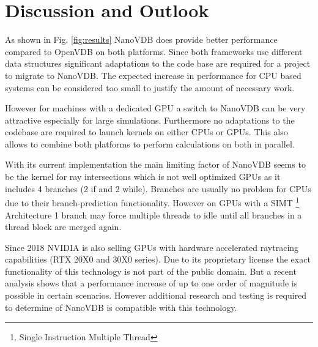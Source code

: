 \section{Discussion and Outlook}

As shown in Fig. \ref{fig:results} NanoVDB does provide better performance compared to OpenVDB on both platforms.
Since both frameworks use different data structures significant adaptations to the code base are required for a project to migrate to NanoVDB. 
The expected increase in performance for CPU based systems can be considered too small to justify the amount of necessary work.

However for machines with a dedicated GPU a switch to NanoVDB can be very attractive especially for large simulations.
Furthermore no adaptations to the codebase are required to launch kernels on either CPUs or GPUs.
This also allows to combine both platforms to perform calculations on both in parallel.

With its current implementation the main limiting factor of NanoVDB seems to be the kernel for ray intersections which is not well optimized GPUs as it includes 4 branches (2 if and 2 while).
Branches are usually no problem for CPUs due to their branch-prediction functionality.
However on GPUs with a SIMT \footnote{Single Instruction Multiple Thread} Architecture 1 branch may force multiple threads to idle until all branches in a thread block are merged again.

Since 2018 NVIDIA is also selling GPUs with hardware accelerated raytracing capabilities (RTX 20X0 and 30X0 series).
Due to its proprietary license the exact functionality of this technology is not part of the public domain.
But a recent analysis \cite{sanzharov2020survey} shows that a performance increase of up to one order of magnitude is possible in certain scenarios.
However additional research and testing is required to determine of NanoVDB is compatible with this technology.
